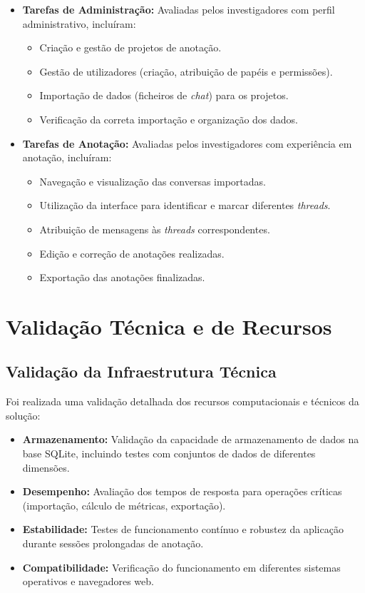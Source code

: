 \begin{itemize}
    \item \textbf{Tarefas de Administração:} Avaliadas pelos investigadores com perfil administrativo, incluíram:
    \begin{itemize}
        \item Criação e gestão de projetos de anotação.
        \item Gestão de utilizadores (criação, atribuição de papéis e permissões).
        \item Importação de dados (ficheiros de \textit{chat}) para os projetos.
        \item Verificação da correta importação e organização dos dados.
    \end{itemize}
    \item \textbf{Tarefas de Anotação:} Avaliadas pelos investigadores com experiência em anotação, incluíram:
    \begin{itemize}
        \item Navegação e visualização das conversas importadas.
        \item Utilização da interface para identificar e marcar diferentes \textit{threads}.
        \item Atribuição de mensagens às \textit{threads} correspondentes.
        \item Edição e correção de anotações realizadas.
        \item Exportação das anotações finalizadas.
    \end{itemize}
\end{itemize}

\section{Validação Técnica e de Recursos}

\subsection{Validação da Infraestrutura Técnica}
Foi realizada uma validação detalhada dos recursos computacionais e técnicos da solução:
\begin{itemize}
    \item \textbf{Armazenamento:} Validação da capacidade de armazenamento de dados na base SQLite, incluindo testes com conjuntos de dados de diferentes dimensões.
    \item \textbf{Desempenho:} Avaliação dos tempos de resposta para operações críticas (importação, cálculo de métricas, exportação).
    \item \textbf{Estabilidade:} Testes de funcionamento contínuo e robustez da aplicação durante sessões prolongadas de anotação.
    \item \textbf{Compatibilidade:} Verificação do funcionamento em diferentes sistemas operativos e navegadores web.
\end{itemize}

